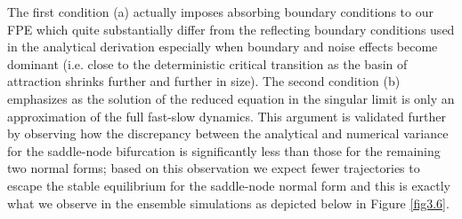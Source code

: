 \documentclass[../main.tex]{subfiles}
\begin{document}
The first condition (a) actually imposes absorbing boundary conditions to our FPE which quite substantially differ from the reflecting boundary conditions used in the analytical derivation especially when boundary and noise effects become dominant (i.e. close to the deterministic critical transition as the basin of attraction shrinks further and further in size).
The second condition (b) emphasizes as the solution of the reduced equation in the singular limit is only an approximation of the full fast-slow dynamics.
This argument is validated further by observing how the discrepancy between the analytical and numerical variance for the saddle-node bifurcation is significantly less than those for the remaining two normal forms; based on this observation we expect fewer trajectories to escape the stable equilibrium for the saddle-node normal form and this is exactly what we observe in the ensemble simulations as depicted below in Figure \ref{fig3.6}.
\end{document}
